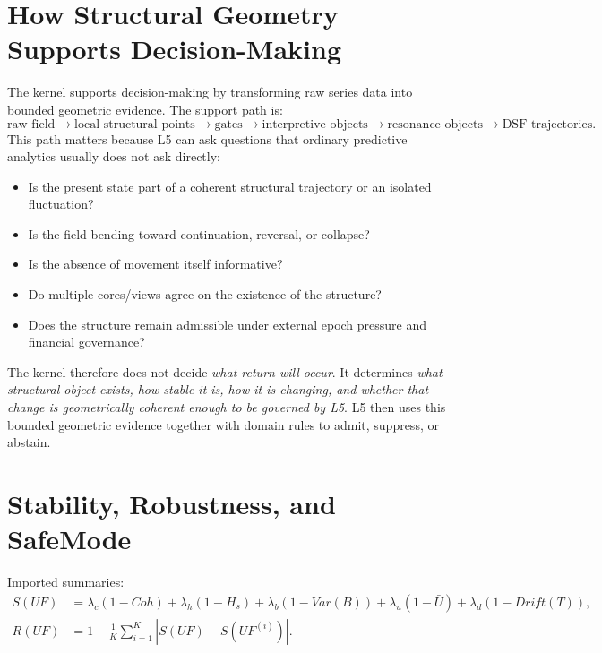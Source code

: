 \section{How Structural Geometry Supports Decision-Making}

The kernel supports decision-making by transforming raw series data into bounded geometric evidence. The support path is:
\[
\text{raw field} \rightarrow \text{local structural points} \rightarrow \text{gates} \rightarrow \text{interpretive objects} \rightarrow \text{resonance objects} \rightarrow \text{DSF trajectories}.
\]
This path matters because L5 can ask questions that ordinary predictive analytics usually does not ask directly:
\begin{itemize}
    \item Is the present state part of a coherent structural trajectory or an isolated fluctuation?
    \item Is the field bending toward continuation, reversal, or collapse?
    \item Is the absence of movement itself informative?
    \item Do multiple cores/views agree on the existence of the structure?
    \item Does the structure remain admissible under external epoch pressure and financial governance?
\end{itemize}

The kernel therefore does not decide \emph{what return will occur}. It determines \emph{what structural object exists, how stable it is, how it is changing, and whether that change is geometrically coherent enough to be governed by L5}. L5 then uses this bounded geometric evidence together with domain rules to admit, suppress, or abstain.

\section{Stability, Robustness, and SafeMode}

Imported summaries:
\begin{align*}
S(UF) &= \lambda_c(1-Coh)+\lambda_h(1-H_s)+\lambda_b(1-Var(B))+\lambda_u(1-\bar U)+\lambda_d(1-Drift(T)),\\
R(UF) &= 1-\frac{1}{K}\sum_{i=1}^{K}\left|S(UF)-S(UF^{(i)})\right|.
\end{align*}

